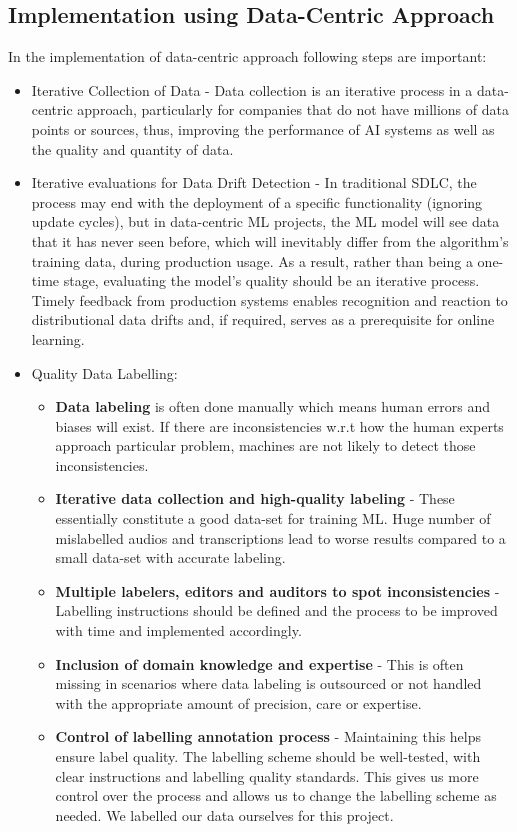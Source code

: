 \subsection{Implementation using Data-Centric Approach}
In the implementation of data-centric approach following steps are important:
\begin{itemize}
    \item Iterative Collection of Data - Data collection is an iterative process in a data-centric approach, particularly for companies that do not have millions of data points or sources, thus, improving the performance of AI systems as well as the quality and quantity of data.
    \item Iterative evaluations for Data Drift Detection - In traditional SDLC, the process may end with the deployment of a specific functionality (ignoring update cycles), but in data-centric ML projects, the ML model will see data that it has never seen before, which will inevitably differ from the algorithm's training data, during production usage. As a result, rather than being a one-time stage, evaluating the model's quality should be an iterative process. Timely feedback from production systems enables recognition and reaction to distributional data drifts and, if required, serves as a prerequisite for online learning. 
    \item Quality Data Labelling: 
    \begin{itemize}
        \item  \textbf{Data labeling} is often done manually which means human errors and biases will exist. If there are inconsistencies w.r.t how the human experts approach particular problem, machines are not likely to detect those inconsistencies.
        \item \textbf{Iterative data collection and high-quality labeling} - These essentially constitute a good data-set for training ML. Huge number of mislabelled audios and transcriptions lead to worse results compared to a small data-set with accurate labeling.
        \item \textbf{Multiple labelers, editors and auditors to spot inconsistencies} - Labelling instructions should be defined and the process to be improved with time and implemented accordingly.
        \item \textbf{Inclusion of domain knowledge and expertise} - This is often missing in scenarios where data labeling is outsourced or not handled with the appropriate amount of precision, care or expertise.
        \item \textbf{Control of labelling annotation process} - Maintaining this helps ensure label quality. The labelling scheme should be well-tested, with clear instructions and labelling quality standards. This gives us more control over the process and allows us to change the labelling scheme as needed. We labelled our data ourselves for this project.

\end{itemize}
\end{itemize}
